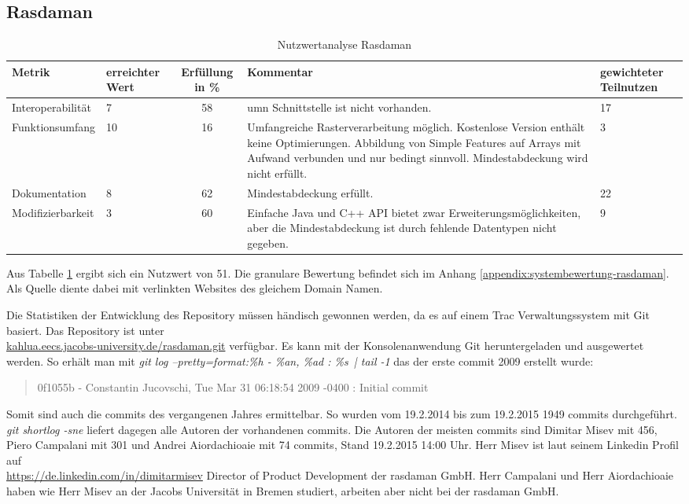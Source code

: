 \subsection{Rasdaman}
\begin{table}[h!]
\centering
\small
\begin{tabular}{l|p{1.8cm}|c|p{3.1cm}|p{1.8cm}}
\textbf{Metrik} & \textbf{erreichter Wert} & \textbf{Erfüllung in \%} & \textbf{Kommentar} & \textbf{gewichteter Teilnutzen} \\ \hline
Interoperabilität & 7 & 58 & \Gls{umn} Schnittstelle ist nicht vorhanden. & 17 \\ \hline
Funktionsumfang & 10 & 16 & Umfangreiche Rasterverarbeitung möglich. Kostenlose Version enthält keine Optimierungen. Abbildung von Simple Features auf Arrays mit Aufwand verbunden und nur bedingt sinnvoll. Mindestabdeckung wird nicht erfüllt. & 3 \\ \hline
Dokumentation & 8 & 62 & Mindestabdeckung erfüllt. & 22 \\ \hline
Modifizierbarkeit & 3 & 60 & Einfache Java und C++ API bietet zwar Erweiterungsmöglichkeiten, aber die Mindestabdeckung ist durch fehlende Datentypen nicht gegeben. & 9 \\
\end{tabular}
\caption{Nutzwertanalyse Rasdaman}
\label{table:nutzwertanalyse-rasdaman}
\end{table}
Aus Tabelle \ref{table:nutzwertanalyse-rasdaman} ergibt sich ein Nutzwert von 51.
Die granulare Bewertung befindet sich im Anhang \ref{appendix:systembewertung-rasdaman}.
Als Quelle diente dabei \cite{website:rasdaman-features} mit verlinkten Websites des gleichem Domain Namen.

Die Statistiken der Entwicklung des Repository müssen händisch gewonnen werden, da es auf einem Trac Verwaltungssystem mit Git basiert.
Das Repository ist unter\\\url{kahlua.eecs.jacobs-university.de/rasdaman.git} verfügbar.
Es kann mit der Konsolenanwendung Git heruntergeladen und ausgewertet werden.
So erhält man mit \textit{git log --pretty=format:\grqq \%h - \%an, \%ad : \%s\grqq\ | tail -1} das der erste commit 2009 erstellt wurde:
\begin{quote}
0f1055b - Constantin Jucovschi, Tue Mar 31 06:18:54 2009 -0400 : Initial commit
\end{quote}
Somit sind auch die commits des vergangenen Jahres ermittelbar.
So wurden vom 19.2.2014 bis zum 19.2.2015 1949 commits durchgeführt.
\textit{git shortlog -sne} liefert dagegen alle Autoren der vorhandenen commits.
Die Autoren der meisten commits sind Dimitar Misev mit 456, Piero Campalani mit 301 und Andrei Aiordachioaie mit 74 commits, Stand 19.2.2015 14:00 Uhr.
Herr Misev ist laut seinem Linkedin Profil auf\\\url{https://de.linkedin.com/in/dimitarmisev} Director of Product Development der \mbox{rasdaman} GmbH.
Herr Campalani und Herr Aiordachioaie haben wie Herr Misev an der Jacobs Universität in Bremen studiert, arbeiten aber nicht bei der \mbox{rasdaman} GmbH.

